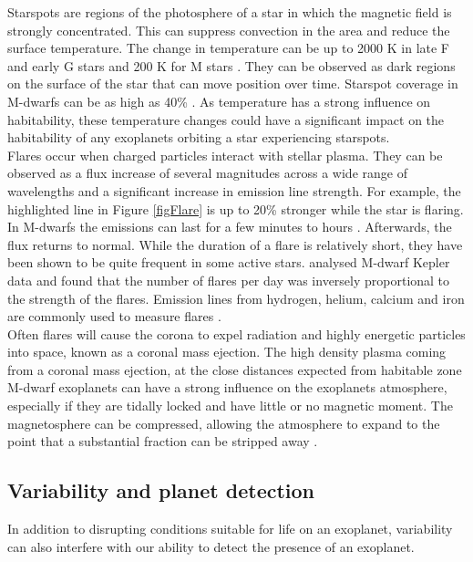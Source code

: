 Starspots are regions of the photosphere of a star in which the magnetic field is strongly concentrated. This can suppress convection in the area and reduce the surface temperature. The change in temperature can be up to 2000 K in late F and early G stars and 200 K for M stars \citep{2009Strassmeier}. They can be observed as dark regions on the surface of the star that can move position over time. Starspot coverage in M-dwarfs can be as high as 40\% \citep{2004AONeal}. As temperature has a strong influence on habitability, these temperature changes could have a significant impact on the habitability of any exoplanets orbiting a star experiencing starspots.\\

Flares occur when charged particles interact with stellar plasma. They can be observed as a flux increase of several magnitudes across a wide range of wavelengths \citep{2012Schmidt} and a significant increase in emission line strength. For example, the highlighted line in Figure \ref{figFlare} is up to 20\% stronger while the star is flaring. In M-dwarfs the emissions can last for a few minutes to hours \citep{2011Hilton}. Afterwards, the flux returns to normal. While the duration of a flare is relatively short, they have been shown to be quite frequent in some active stars. \citet{2014Hawley} analysed M-dwarf Kepler data and found that the number of flares per day was inversely proportional to the strength of the flares. Emission lines from hydrogen, helium, calcium and iron are commonly used to measure flares \citep{2005Reid}.\\

Often flares will cause the corona to expel radiation and highly energetic particles into space, known as a coronal mass ejection. The high density plasma coming from a coronal mass ejection, at the close distances expected from habitable zone M-dwarf exoplanets can have a strong influence on the exoplanets atmosphere, especially if they are tidally locked and have little or no magnetic moment. The magnetosphere can be compressed, allowing the atmosphere to expand to the point that a substantial fraction can be stripped away \citep{2007Lammer}.
\subsection{Variability and planet detection}
\label{SecActivity}
In addition to disrupting conditions suitable for life on an exoplanet, variability can also interfere with our ability to detect the presence of an exoplanet.\\

